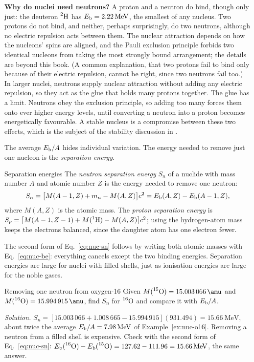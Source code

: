 \textbf{Why do nuclei need neutrons?} A proton and a neutron do bind, though only just: the deuteron
$\prescript{2}{}{\mathrm{H}}$ has $\Eb=\SI{2.22}{\MeV}$, the smallest of any nucleus. Two protons do not bind, and
neither, perhaps surprisingly, do two neutrons, although no electric repulsion acts between them. The
nuclear attraction depends on how the nucleons' spins are aligned, and the Pauli exclusion principle
forbids two identical nucleons from taking the most strongly bound arrangement; the details are beyond
this book. (A common explanation, that two protons fail to bind only because of their electric
repulsion, cannot be right, since two neutrons fail too.) In larger nuclei, neutrons supply nuclear
attraction without adding any electric repulsion, so they act as the glue that holds many protons
together. The glue has a limit. Neutrons obey the exclusion principle, so adding too many forces them
onto ever higher energy levels, until converting a neutron into a proton becomes energetically
favourable. A stable nucleus is a compromise between these two effects, which is the subject of the
stability discussion in .

The average $E_{\mathrm{b}}/A$ hides individual variation. The energy needed to remove just one nucleon is the
\emph{separation energy}.
\begin{defbox}{Separation energies}
The \emph{neutron separation energy} $S_n$ of a nuclide with mass number $A$ and atomic number $Z$ is the
energy needed to remove one neutron:
\begin{equation}\label{eq:nuc-sn}
S_n=\big[M(A-1,Z)+m_n-M(A,Z)\big]c^2=E_{\mathrm{b}}(A,Z)-E_{\mathrm{b}}(A-1,Z),
\end{equation}
where $M(A,Z)$ is the atomic mass. The \emph{proton separation energy} is
$S_p=\big[M(A-1,Z-1)+M(\prescript{1}{}{\mathrm{H}})-M(A,Z)\big]c^2$; using the hydrogen-atom mass keeps the electrons
balanced, since the daughter atom has one electron fewer.
\end{defbox}
The second form of Eq.~\eqref{eq:nuc-sn} follows by writing both atomic masses with
Eq.~\eqref{eq:nuc-be}: everything cancels except the two binding energies. Separation energies are
large for nuclei with filled shells, just as ionisation energies are large for the noble gases.

\begin{exbox}{Removing one neutron from oxygen-16}\label{ex:nuc-sn}
Given $M(\iso{15}{O})=\SI{15.003066}{\amu}$ and $M(\iso{16}{O})=\SI{15.994915}{\amu}$, find $S_n$ for
$\prescript{16}{}{\mathrm{O}}$ and compare it with $E_{\mathrm{b}}/A$.

\emph{Solution.} $S_n=[15.003\,066+1.008\,665-15.994\,915](931.494)=\SI{15.66}{\MeV}$, about twice the
average $\Eb/A=\SI{7.98}{\MeV}$ of Example~\ref{ex:nuc-o16}. Removing a neutron from a filled shell is
expensive. Check with the second form of Eq.~\eqref{eq:nuc-sn}:
$\Eb(\iso{16}{O})-\Eb(\iso{15}{O})=127.62-111.96=\SI{15.66}{\MeV}$, the same answer.
\end{exbox}

